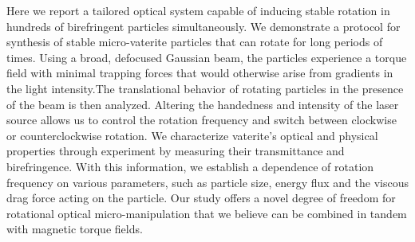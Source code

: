 Here we report a tailored optical system capable of inducing stable rotation in hundreds of birefringent particles simultaneously. We demonstrate a protocol for synthesis of stable micro-vaterite particles that can rotate for long periods of times. Using a broad, defocused Gaussian beam, the particles experience a torque field with minimal trapping forces that would otherwise arise from gradients in the light intensity.The translational behavior of rotating particles in the presence of the beam is then analyzed. Altering the handedness and intensity of the laser source allows us to control the rotation frequency and switch between clockwise or counterclockwise rotation.  We characterize vaterite's optical and physical properties through experiment by measuring their transmittance and birefringence. With this information, we establish a dependence of rotation frequency on various parameters, such as particle size, energy flux and the viscous drag force acting on the particle. Our study offers a novel degree of freedom for rotational optical micro-manipulation that we believe can be combined in tandem with magnetic torque fields.
